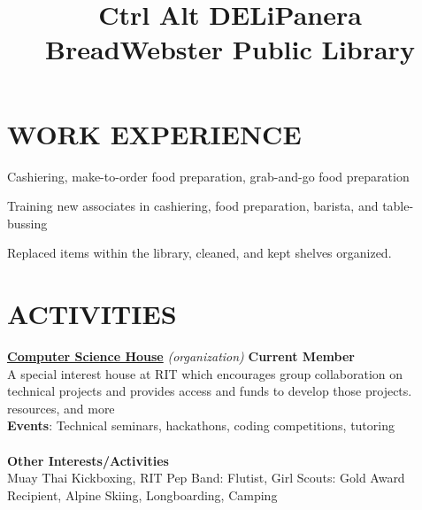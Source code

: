 \documentclass[line,margin]{res}
\begin{document}
\begin{resume}
\section{WORK EXPERIENCE}
\title{\textbf{Ctrl Alt DELi}}
\begin{position}
    Cashiering, make-to-order food preparation, grab-and-go food preparation
\end{position}
\title{\textbf{Panera Bread}}
\begin{position}
    Training new associates in cashiering, food preparation, barista, and table-bussing
\end{position}
\title{\textbf{Webster Public Library}}
\begin{position}
    Replaced items within the library, cleaned, and kept shelves organized.
\end{position}

\section{ACTIVITIES}
\href{https://csh.rit.edu}{\textbf{Computer Science House}}
{\sl (organization)}\hfill
\textbf{Current Member}\\
A special interest house at RIT which encourages group collaboration on technical 
projects and provides access and funds to develop those projects.
resources, and more\\
\textbf{Events}: 
Technical seminars, hackathons, coding competitions, tutoring\\\\
\textbf{Other Interests/Activities}\\
Muay Thai Kickboxing, RIT Pep Band: Flutist, Girl Scouts: Gold Award Recipient, Alpine Skiing, Longboarding, Camping

\end{resume}


\makebox[0pt][l]{}%
\makebox[\textwidth][c]{}%
\end{document}
